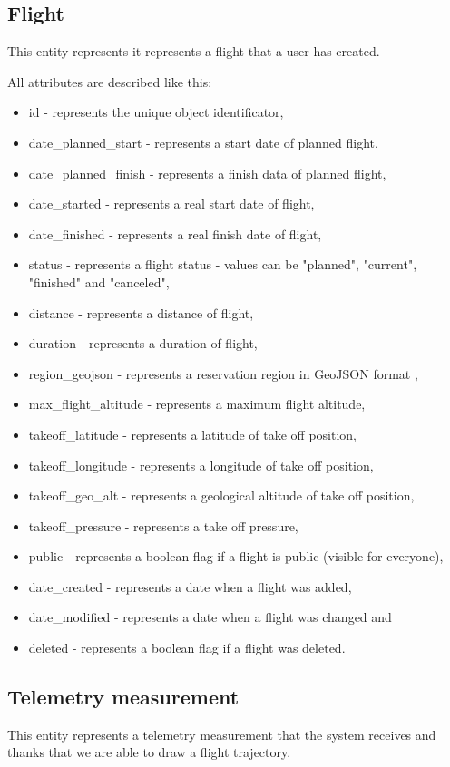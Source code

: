 \subsection{Flight}\label{subsec:flight}
This entity represents it represents a flight that a user has created.

All attributes are described like this:
\begin{itemize}
    \item id - represents the unique object identificator,
    \item date\_planned\_start - represents a start date of planned flight,
    \item date\_planned\_finish - represents a finish data of planned flight,
    \item date\_started - represents a real start date of flight,
    \item date\_finished - represents a real finish date of flight,
    \item status - represents a flight status - values can be "planned", "current", "finished" and "canceled",
    \item distance - represents a distance of flight,
    \item duration - represents a duration of flight,
    \item region\_geojson - represents a reservation region in GeoJSON format \cite{geoJson},
    \item max\_flight\_altitude - represents a maximum flight altitude,
    \item takeoff\_latitude - represents a latitude of take off position,
    \item takeoff\_longitude - represents a longitude of take off position,
    \item takeoff\_geo\_alt - represents a geological altitude of take off position,
    \item takeoff\_pressure - represents a take off pressure,
    \item public - represents a boolean flag if a flight is public (visible for everyone),
    \item date\_created - represents a date when a flight was added,
    \item date\_modified - represents a date when a flight was changed and
    \item deleted - represents a boolean flag if a flight was deleted.
\end{itemize}

\subsection{Telemetry measurement}\label{subsec:telemetry-measurement}
This entity represents a telemetry measurement that the system receives and thanks that we are able to draw a flight trajectory.

